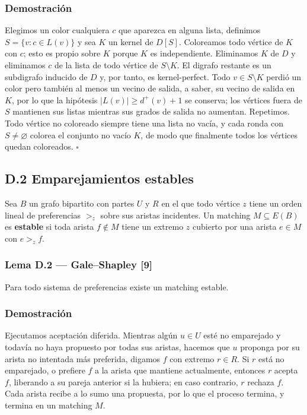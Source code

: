 \documentclass[spanish,11pt,a4paper]{article}
\begin{document}
\subsubsection{Demostración}\label{demostraciuxf3n-9}

Elegimos un color cualquiera \(c\) que aparezca en alguna lista,
definimos \(S=\{v:c\in L(v)\}\) y sea \(K\) un kernel de \(D[S]\).
Coloreamos todo vértice de \(K\) con \(c\); esto es propio sobre \(K\)
porque \(K\) es independiente. Eliminamos \(K\) de \(D\) y eliminamos
\(c\) de la lista de todo vértice de \(S\setminus K\). El digrafo
restante es un subdigrafo inducido de \(D\) y, por tanto, es
kernel-perfect. Todo \(v\in S\setminus K\) perdió un color pero también
al menos un vecino de salida, a saber, su vecino de salida en \(K\), por
lo que la hipótesis \(|L(v)|\ge d^+(v)+1\) se conserva; los vértices
fuera de \(S\) mantienen sus listas mientras sus grados de salida no
aumentan. Repetimos. Todo vértice no coloreado siempre tiene una lista
no vacía, y cada ronda con \(S\ne\varnothing\) colorea el conjunto no
vacío \(K\), de modo que finalmente todos los vértices quedan
coloreados. \(\square\)

\subsection{D.2 Emparejamientos
estables}\label{d.2-emparejamientos-estables}

Sea \(B\) un grafo bipartito con partes \(U\) y \(R\) en el que todo
vértice \(z\) tiene un orden lineal de preferencias \(>_z\) sobre sus
aristas incidentes. Un matching \(M\subseteq E(B)\) es \textbf{estable}
si toda arista \(f\notin M\) tiene un extremo \(z\) cubierto por una
arista \(e\in M\) con \(e>_zf\).

\subsubsection{Lema D.2 --- Gale--Shapley
{[}9{]}}\label{lema-d.2-galeshapley-9}

Para todo sistema de preferencias existe un matching estable.

\subsubsection{Demostración}\label{demostraciuxf3n-10}

Ejecutamos aceptación diferida. Mientras algún \(u\in U\) esté no
emparejado y todavía no haya propuesto por todas sus aristas, hacemos
que \(u\) proponga por su arista no intentada más preferida, digamos
\(f\) con extremo \(r\in R\). Si \(r\) está no emparejado, o prefiere
\(f\) a la arista que mantiene actualmente, entonces \(r\) acepta \(f\),
liberando a su pareja anterior si la hubiera; en caso contrario, \(r\)
rechaza \(f\). Cada arista recibe a lo sumo una propuesta, por lo que el
proceso termina, y termina en un matching \(M\).
\end{document}
